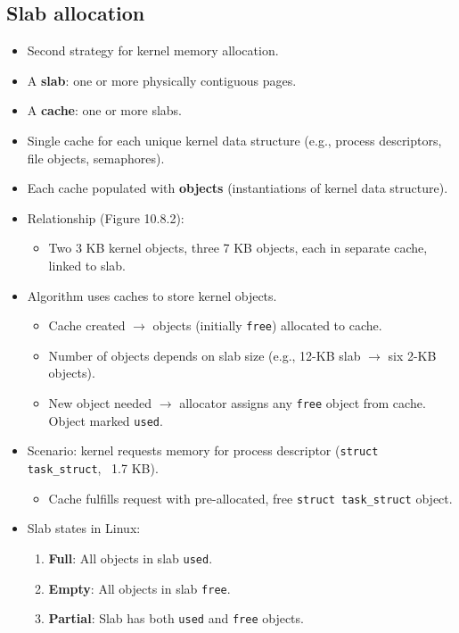 \subsection{Slab allocation}
\begin{itemize}
    \item Second strategy for kernel memory allocation.
    \item A \textbf{slab}: one or more physically contiguous pages.
    \item A \textbf{cache}: one or more slabs.
    \item Single cache for each unique kernel data structure (e.g., process descriptors, file objects, semaphores).
    \item Each cache populated with \textbf{objects} (instantiations of kernel data structure).
    \item Relationship (Figure 10.8.2):
    \begin{itemize}
        \item Two 3 KB kernel objects, three 7 KB objects, each in separate cache, linked to slab.
    \end{itemize}
    \item Algorithm uses caches to store kernel objects.
    \begin{itemize}
        \item Cache created $\rightarrow$ objects (initially \texttt{free}) allocated to cache.
        \item Number of objects depends on slab size (e.g., 12-KB slab $\rightarrow$ six 2-KB objects).
        \item New object needed $\rightarrow$ allocator assigns any \texttt{free} object from cache. Object marked \texttt{used}.
    \end{itemize}
    \item Scenario: kernel requests memory for process descriptor (\texttt{struct task\_struct}, ~1.7 KB).
    \begin{itemize}
        \item Cache fulfills request with pre-allocated, free \texttt{struct task\_struct} object.
    \end{itemize}
    \item Slab states in Linux:
    \begin{enumerate}
        \item \textbf{Full}: All objects in slab \texttt{used}.
        \item \textbf{Empty}: All objects in slab \texttt{free}.
        \item \textbf{Partial}: Slab has both \texttt{used} and \texttt{free} objects.

\end{enumerate}
\end{itemize}
